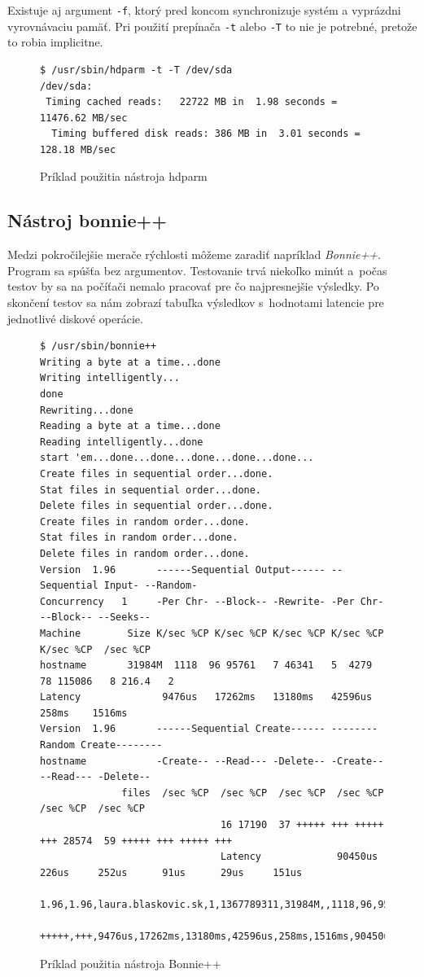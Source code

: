 Existuje aj argument \texttt{-f}, ktorý pred koncom synchronizuje systém a
vyprázdni vyrovnávaciu pamäť. Pri použití prepínača \texttt{-t} alebo
\texttt{-T} to nie je potrebné, pretože to robia implicitne.

\begin{figure}[H]
\begin{lstlisting}
$ /usr/sbin/hdparm -t -T /dev/sda
/dev/sda:
 Timing cached reads:   22722 MB in  1.98 seconds = 11476.62 MB/sec
  Timing buffered disk reads: 386 MB in  3.01 seconds = 128.18 MB/sec

\end{lstlisting}
\caption{Príklad použitia nástroja hdparm}
\label{alg:hdparm-usage}
\end{figure}

%
%

\subsection*{Nástroj bonnie++}

Medzi pokročilejšie merače rýchlosti môžeme zaradiť napríklad \emph{Bonnie++}. Program sa spúšťa bez argumentov. Testovanie trvá niekoľko minút a~počas testov by sa na počíťači nemalo pracovať pre čo najpresnejšie výsledky. Po skončení testov sa nám zobrazí tabuľka výsledkov s~hodnotami latencie pre jednotlivé diskové operácie.

\begin{figure}[H]
\begin{lstlisting}
$ /usr/sbin/bonnie++
Writing a byte at a time...done
Writing intelligently...
done
Rewriting...done
Reading a byte at a time...done
Reading intelligently...done
start 'em...done...done...done...done...done...
Create files in sequential order...done.
Stat files in sequential order...done.
Delete files in sequential order...done.
Create files in random order...done.
Stat files in random order...done.
Delete files in random order...done.
Version  1.96       ------Sequential Output------ --Sequential Input- --Random-
Concurrency   1     -Per Chr- --Block-- -Rewrite- -Per Chr- --Block-- --Seeks--
Machine        Size K/sec %CP K/sec %CP K/sec %CP K/sec %CP K/sec %CP  /sec %CP
hostname       31984M  1118  96 95761   7 46341   5  4279  78 115086   8 216.4   2
Latency              9476us   17262ms   13180ms   42596us     258ms    1516ms
Version  1.96       ------Sequential Create------ --------Random Create--------
hostname            -Create-- --Read--- -Delete-- -Create-- --Read--- -Delete--
              files  /sec %CP  /sec %CP  /sec %CP  /sec %CP  /sec %CP  /sec %CP
                               16 17190  37 +++++ +++ +++++ +++ 28574  59 +++++ +++ +++++ +++
                               Latency             90450us     226us     252us      91us      29us     151us
                               1.96,1.96,laura.blaskovic.sk,1,1367789311,31984M,,1118,96,95761,7,46341,5,4279,78,115086,8,216.4,2,16,,,,,17190,37,+++++,+++,+++++,+++,28574,59,+++++,+++,
                               +++++,+++,9476us,17262ms,13180ms,42596us,258ms,1516ms,90450us,226us,252us,91us,29us,151us
\end{lstlisting}
\caption{Príklad použitia nástroja Bonnie++}
\label{alg:bonnie-usage}
\end{figure}


